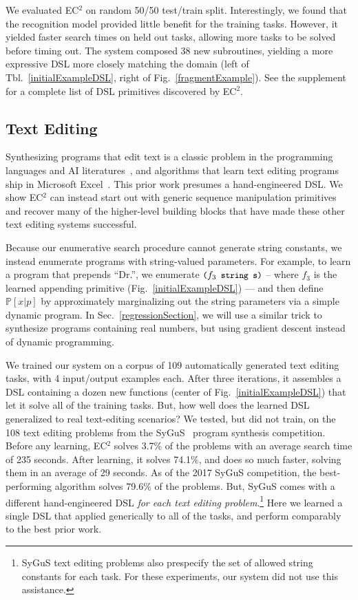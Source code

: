 \documentclass{article}
\newcommand{\system}{\textsc{EC$^2$} }
\newcommand{\systemEnding}{\textsc{EC$^2$}}
\newcommand{\code}[1]{{\footnotesize\texttt{#1}}}
\newcommand{\probability}{\mathds{P}} %
\begin{document}
We evaluated \system on  random 50/50 test/train split.
Interestingly, we found that the recognition model provided little benefit for the training
tasks. However, it yielded faster search times on held out tasks, allowing
more tasks to be solved before timing out.
The system composed 38 new subroutines, yielding a more expressive DSL more closely matching the
domain (left of Tbl.~\ref{initialExampleDSL}, right of
Fig.~\ref{fragmentExample}). See the supplement for a complete list of
DSL primitives discovered by \systemEnding.

\subsection{Text Editing}\label{textSection}
Synthesizing programs that edit text is a classic problem in the
programming languages and AI literatures~\cite{menon2013machine,lau2001programming},
and algorithms that learn text editing programs ship in Microsoft Excel~\cite{gulwani2011automating}.
This prior work presumes a hand-engineered DSL.
We show \system can instead start out with generic sequence manipulation
primitives and recover many of the higher-level building blocks that have
made these other text editing systems successful.

Because our enumerative search procedure cannot generate string
constants, we instead enumerate programs with string-valued
parameters.  For example, to learn a program that prepends ``Dr.'', we
enumerate $\text{\code{(}}f_3\code{ string s)}$ -- where $f_3$ is the
learned appending primitive (Fig.~\ref{initialExampleDSL}) --- and then
define $\probability[x|p]$ by approximately marginalizing out the
string parameters via a simple dynamic program.
In Sec.~\ref{regressionSection}, we will use a similar trick to
synthesize programs containing real numbers, but using gradient
descent instead of dynamic programming.

We trained our system on a corpus of 109 automatically generated text editing tasks, with 4 input/output examples each.
After three iterations, it assembles a DSL containing a dozen new functions (center of Fig.~\ref{initialExampleDSL}) that let it solve 
all of the training tasks.
But, how well does the  learned DSL generalized to real text-editing scenarios?
We tested, but did not train, on the 108 text editing problems from the SyGuS~\cite{alur2016sygus} program synthesis competition. Before any learning,
\system solves 3.7\% of the problems with an average search time of 235 seconds.
After learning,
it solves 74.1\%, and does so much faster,
solving them in an average of 29 seconds.
As of the 2017 SyGuS competition,
the best-performing algorithm solves 79.6\% of the problems.
But, SyGuS comes with a
different hand-engineered DSL \emph{for each text editing problem}.\footnote{SyGuS text editing problems also prespecify the set of allowed string constants for each task. For these experiments, our system did not use this assistance.}
Here  we learned a single DSL
that applied generically to
all of the tasks,
and perform comparably to the best
prior work.
\end{document}
